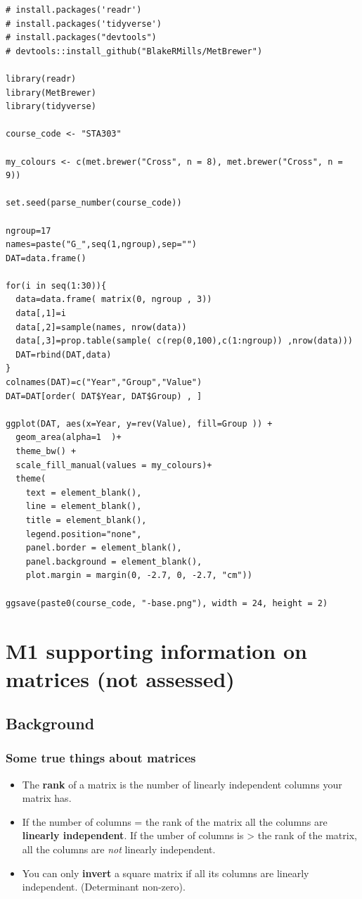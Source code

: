 \documentclass[
  openany]{book}
\providecommand{\tightlist}{%
  \setlength{\itemsep}{0pt}\setlength{\parskip}{0pt}}
\begin{document}
\begin{verbatim}
# install.packages('readr')
# install.packages('tidyverse')
# install.packages("devtools")
# devtools::install_github("BlakeRMills/MetBrewer")

library(readr)
library(MetBrewer)
library(tidyverse)

course_code <- "STA303"

my_colours <- c(met.brewer("Cross", n = 8), met.brewer("Cross", n = 9))

set.seed(parse_number(course_code))

ngroup=17
names=paste("G_",seq(1,ngroup),sep="")
DAT=data.frame()

for(i in seq(1:30)){
  data=data.frame( matrix(0, ngroup , 3))
  data[,1]=i
  data[,2]=sample(names, nrow(data))
  data[,3]=prop.table(sample( c(rep(0,100),c(1:ngroup)) ,nrow(data)))
  DAT=rbind(DAT,data)
}
colnames(DAT)=c("Year","Group","Value")
DAT=DAT[order( DAT$Year, DAT$Group) , ]

ggplot(DAT, aes(x=Year, y=rev(Value), fill=Group )) +
  geom_area(alpha=1  )+
  theme_bw() +
  scale_fill_manual(values = my_colours)+
  theme(
    text = element_blank(),
    line = element_blank(),
    title = element_blank(),
    legend.position="none",
    panel.border = element_blank(),
    panel.background = element_blank(),
    plot.margin = margin(0, -2.7, 0, -2.7, "cm"))

ggsave(paste0(course_code, "-base.png"), width = 24, height = 2)
\end{verbatim}

\hypertarget{matrices}{%
\section{M1 supporting information on matrices (not assessed)}\label{matrices}}

\hypertarget{background-1}{%
\subsection{Background}\label{background-1}}

\hypertarget{some-true-things-about-matrices}{%
\subsubsection{Some true things about matrices}\label{some-true-things-about-matrices}}

\begin{itemize}
\tightlist
\item
  The \textbf{rank} of a matrix is the number of linearly independent columns your matrix has.\\
\item
  If the number of columns = the rank of the matrix all the columns are \textbf{linearly independent}. If the umber of columns is \textgreater{} the rank of the matrix, all the columns are \emph{not} linearly independent.\\
\item
  You can only \textbf{invert} a square matrix if all its columns are linearly independent. (Determinant non-zero).
\end{itemize}
\end{document}
